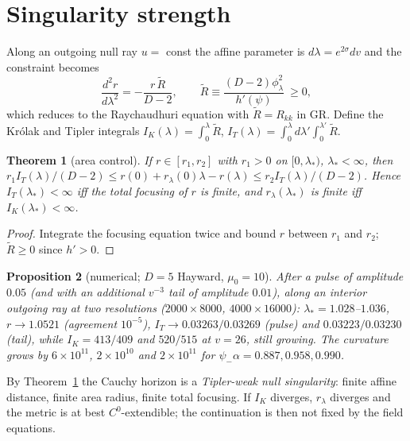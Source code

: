\documentclass[11pt,a4paper]{article}
\newtheorem{theorem}{Theorem}
\newtheorem{proposition}[theorem]{Proposition}
\theoremstyle{remark}\newtheorem{remark}[theorem]{Remark}
\begin{document}
\section{Singularity strength}
Along an outgoing null ray $u=$ const the affine parameter is $d\lambda=e^{2\sigma}dv$ and the constraint becomes
\begin{equation}
\frac{d^2r}{d\lambda^2}=-\frac{r\,\tilde R}{D-2},\qquad \tilde R\equiv\frac{(D-2)\phi_\lambda^2}{h'(\psi)}\ \ge0 ,
\end{equation}
which reduces to the Raychaudhuri equation with $\tilde R=R_{kk}$ in GR. Define the Kr\'olak and Tipler integrals
$I_K(\lambda)=\int_0^\lambda\tilde R$, $I_T(\lambda)=\int_0^\lambda d\lambda'\int_0^{\lambda'}\tilde R$.
\begin{theorem}[area control]\label{thm:area}
If $r\in[r_1,r_2]$ with $r_1>0$ on $[0,\lambda_*)$, $\lambda_*<\infty$, then
$r_1I_T(\lambda)/(D-2)\le r(0)+r_\lambda(0)\lambda-r(\lambda)\le r_2I_T(\lambda)/(D-2)$. Hence $I_T(\lambda_*)<\infty$ iff the total
focusing of $r$ is finite, and $r_\lambda(\lambda_*)$ is finite iff $I_K(\lambda_*)<\infty$.
\end{theorem}
\begin{proof}Integrate the focusing equation twice and bound $r$ between $r_1$ and $r_2$; $\tilde R\ge0$ since $h'>0$.\end{proof}

\begin{proposition}[numerical; $D=5$ Hayward, $\mu_0=10$]
After a pulse of amplitude $0.05$ (and with an additional $v^{-3}$ tail of amplitude $0.01$), along an interior outgoing ray at two
resolutions ($2000\times8000$, $4000\times16000$): $\lambda_*=1.028$--$1.036$, $r\to1.0521$ (agreement $10^{-5}$),
$I_T\to0.03263/0.03269$ (pulse) and $0.03223/0.03230$ (tail), while $I_K=413/409$ and $520/515$ at $v=26$, still growing. The
curvature grows by $6\times10^{11}$, $2\times10^{10}$ and $2\times10^{11}$ for $\psi_-\alpha=0.887,0.958,0.990$.
\end{proposition}
By Theorem~\ref{thm:area} the Cauchy horizon is a \emph{Tipler-weak null singularity}: finite affine distance, finite area radius,
finite total focusing. If $I_K$ diverges, $r_\lambda$ diverges and the metric is at best $C^0$-extendible; the continuation is then not
fixed by the field equations.
\end{document}
